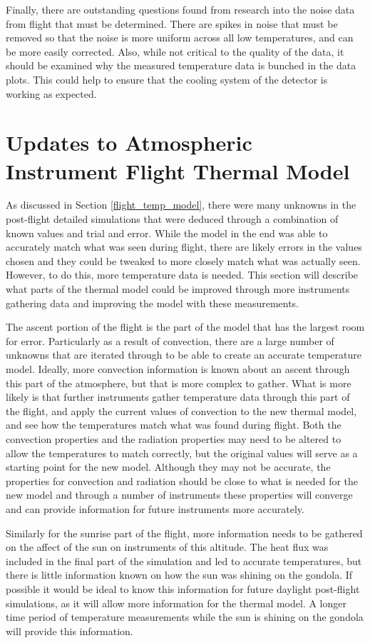 Finally, there are outstanding questions found from research into the noise data from flight that must be determined. There are spikes in noise that must be removed so that the noise is more uniform across all low temperatures, and can be more easily corrected. Also, while not critical to the quality of the data, it should be examined why the measured temperature data is bunched in the data plots. This could help to ensure that the cooling system of the detector is working as expected.

\section{Updates to Atmospheric Instrument Flight Thermal Model}
As discussed in Section \ref{flight_temp_model}, there were many unknowns in the post-flight detailed simulations that were deduced through a combination of known values and trial and error. While the model in the end was able to accurately match what was seen during flight, there are likely errors in the values chosen and they could be tweaked to more closely match what was actually seen. However, to do this, more temperature data is needed. This section will describe what parts of the thermal model could be improved through more instruments gathering data and improving the model with these measurements.

The ascent portion of the flight is the part of the model that has the largest room for error. Particularly as a result of convection, there are a large number of unknowns that are iterated through to be able to create an accurate temperature model. Ideally, more convection information is known about an ascent through this part of the atmosphere, but that is more complex to gather. What is more likely is that further instruments gather temperature data through this part of the flight, and apply the current values of convection to the new thermal model, and see how the temperatures match what was found during flight. Both the convection properties and the radiation properties may need to be altered to allow the temperatures to match correctly, but the original values will serve as a starting point for the new model. Although they may not be accurate, the properties for convection and radiation should be close to what is needed for the new model and through a number of instruments these properties will converge and can provide information for future instruments more accurately. 

Similarly for the sunrise part of the flight, more information needs to be gathered on the affect of the sun on instruments of this altitude. The heat flux was included in the final part of the simulation and led to accurate temperatures, but there is little information known on how the sun was shining on the gondola. If possible it would be ideal to know this information for future daylight post-flight simulations, as it will allow more information for the thermal model. A longer time period of temperature measurements while the sun is shining on the gondola will provide this information.

